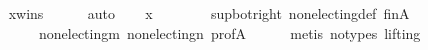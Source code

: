 \begin{isabellebody}
\ \ \ \ \isamarkupfalse%
\ x{\isacharunderscore}{\kern0pt}wins\isanewline
\ \ \ \ \isamarkupfalse%
\ auto\isanewline
\ \ \isamarkupfalse%
\ {\isachardoublequoteopen}x\ {\isasymin}\ {\isacharbraceleft}{\kern0pt}{\isacharbraceright}{\kern0pt}{\isachardoublequoteclose}\isanewline
\ \ \ \ \isamarkupfalse%
\ sup{\isacharunderscore}{\kern0pt}bot{\isacharunderscore}{\kern0pt}right\ non{\isacharunderscore}{\kern0pt}electing{\isacharunderscore}{\kern0pt}def\ fin{\isacharunderscore}{\kern0pt}A\isanewline
\ \ \ \ \ \ \ \ \ \ non{\isacharunderscore}{\kern0pt}electing{\isacharunderscore}{\kern0pt}m\ non{\isacharunderscore}{\kern0pt}electing{\isacharunderscore}{\kern0pt}n\ prof{\isacharunderscore}{\kern0pt}A\isanewline
\ \ \ \ \isamarkupfalse%
\ {\isacharparenleft}{\kern0pt}metis\ {\isacharparenleft}{\kern0pt}no{\isacharunderscore}{\kern0pt}types{\isacharcomma}{\kern0pt}\ lifting{\isacharparenright}{\kern0pt}{\isacharparenright}{\kern0pt}\isanewline
{}\isamarkupfalse%
%
\endisatagproof
{\isafoldproof}%
%
\isadelimproof
\isanewline
%
\endisadelimproof
%
\isadelimtheory
\isanewline
%
\endisadelimtheory
%
\isatagtheory
{}\isamarkupfalse%
%
\endisatagtheory
{\isafoldtheory}%
%
\isadelimtheory
%
\endisadelimtheory
%
\end{isabellebody}%
\endinput
